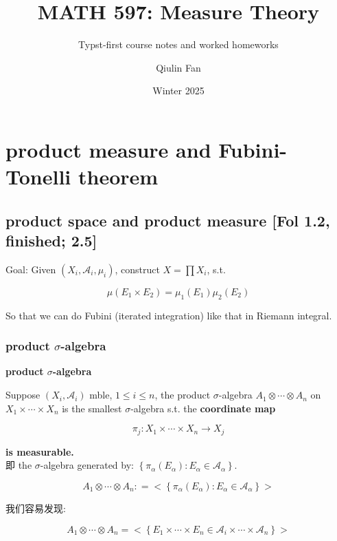 \documentclass{qlnotes-export}
\title{MATH 597: Measure Theory}
\subtitle{Typst-first course notes and worked homeworks}
\author{Qiulin Fan}
\date{Winter 2025}
\begin{document}
\mainmatter
\chapter{product measure and Fubini-Tonelli theorem}\label{product-measure-and-fubini-tonelli-theorem}

\section{product space and product measure {[}Fol 1.2, finished; 2.5{]}}

Goal: Given \((X_{i},\mathcal{A}_{i},\mu_{i})\), construct \(X = \prod X_{i}\), s.t.

\[\mu(E_{1} \times E_{2}) = \mu_{1}(E_{1})\mu_{2}(E_{2})\]

So that we can do Fubini (iterated integration) like that in Riemann integral.

\subsection{\texorpdfstring{product \(\sigma\)-algebra}{product \textbackslash sigma-algebra}}\label{product-sigma-algebra}

\begin{definition}{\protect{}\label{kn-product-sigma-algebra}{\textbf{product
\(\sigma\)-algebra}}}

Suppose \((X_{i},\mathcal{A}_{i})\) mble, \(1 \leq i \leq n\), the product \(\sigma\)-algebra \(A_{1} \otimes \cdots \otimes A_{n}\) on \(X_{1} \times \cdots \times X_{n}\) is the smallest \(\sigma\)-algebra s.t. the \textbf{coordinate map}

\[\pi_{j}:X_{1} \times \cdots \times X_{n}\rightarrow X_{j}\]

\textbf{is measurable.}\\
即 the \(\sigma\)-algebra generated by: \(\left\{ {\pi_{\alpha}(E_{\alpha}):E_{\alpha} \in \mathcal{A}_{\alpha}} \right\}\).

\[A_{1} \otimes \cdots \otimes A_{n}: = < \left\{ {\pi_{\alpha}(E_{\alpha}):E_{\alpha} \in \mathcal{A}_{\alpha}} \right\} >\]

\end{definition}

我们容易发现:

\begin{proposition}

\[A_{1} \otimes \cdots \otimes A_{n} = < \left\{ {E_{1} \times \cdots \times E_{n} \in \mathcal{A}_{i} \times \cdots \times \mathcal{A}_{n}} \right\} >\]

\end{proposition}
\end{document}
